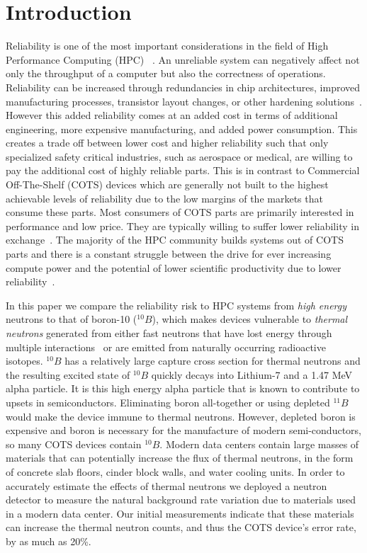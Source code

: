 \section{Introduction}
\label{sec_introduction}

Reliability is one of the most important considerations
in the field of High Performance Computing (HPC) ~\cite{toptenexascale, NSF2018, ISO26262}.
An unreliable system can negatively affect not only the throughput of a computer but also the correctness of operations.
Reliability can be increased through redundancies in chip architectures, improved manufacturing processes, transistor layout changes, or other hardening solutions~\cite{ziegler2004ser}. However this added reliability comes at an added 
cost in terms of additional engineering, more expensive manufacturing, and added power consumption. This creates a trade off
between lower cost and higher reliability such that only specialized safety critical 
industries, such as aerospace or medical, are willing to pay the additional cost of highly
reliable parts.
This is in contrast to Commercial Off-The-Shelf (COTS) devices which are generally not built to the highest achievable levels of reliability due to the low margins of the markets that consume these parts. Most consumers of COTS parts are primarily interested in performance and low price. They are typically willing to suffer lower reliability in exchange~\cite{ziegler2004ser, Baumann2005}.  The majority of the HPC community builds systems out of COTS parts and there is a constant struggle between the   
drive for ever increasing compute power and the potential of lower
 scientific productivity due to lower reliability~\cite{snir2014addressing}.


In this paper we compare the reliability risk to HPC systems from \textit{high energy} neutrons to that of boron-10 ($^{10}B$), which makes devices vulnerable  to \textit{thermal neutrons} generated from either fast neutrons that have lost energy through multiple interactions~\cite{Baumann2005, ziegler2003} or are emitted from naturally occurring radioactive isotopes. $^{10}B$ has a relatively large capture cross section for thermal neutrons and the resulting excited state of $^{10}B$ quickly decays into Lithium-7 and a 1.47 MeV alpha particle. It is this high energy alpha particle that is known to contribute to upsets in semiconductors. Eliminating boron all-together or using depleted $^{11}B$ would make the device immune to thermal neutrons. However, depleted boron is expensive and boron is necessary for the manufacture of modern semi-conductors, so many COTS devices contain $^{10}B$.  Modern data centers contain large masses of materials that can potentially increase the flux of thermal neutrons, in the form of concrete
slab floors, cinder block walls, and water cooling units. In order to accurately estimate the effects of thermal neutrons we deployed a neutron detector to measure the natural background rate variation due to materials used in a modern data center. Our initial measurements indicate that these materials  can increase the thermal neutron counts, and thus the COTS device's error rate, by as much as 20\%. 

